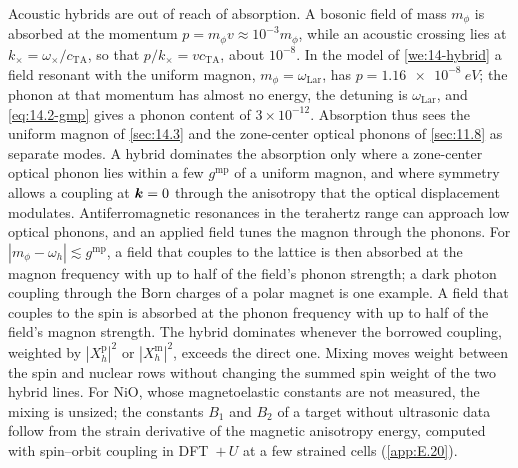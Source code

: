 Acoustic hybrids are out of reach of absorption. A bosonic field of mass $m_\phi$ is absorbed at the momentum $p = m_\phi v \approx 10^{-3}m_\phi$, while an acoustic crossing lies at $k_\times = \omega_\times/c_{\mathrm{TA}}$, so that $p/k_\times = vc_{\mathrm{TA}}$, about $10^{-8}$. In the model of \cref{we:14-hybrid} a field resonant with the uniform magnon, $m_\phi = \omega_{\mathrm{Lar}}$, has $p = \SI{1.16e-8}{eV}$; the phonon at that momentum has almost no energy, the detuning is $\omega_{\mathrm{Lar}}$, and \cref{eq:14.2-gmp} gives a phonon content of $3\times10^{-12}$. Absorption thus sees the uniform magnon of \cref{sec:14.3} and the zone-center optical phonons of \cref{sec:11.8} as separate modes. A hybrid dominates the absorption only where a zone-center optical phonon lies within a few $g^{\mathrm{mp}}$ of a uniform magnon, and where symmetry allows a coupling at $\bm{k} = 0$ through the anisotropy that the optical displacement modulates. Antiferromagnetic resonances in the terahertz range can approach low optical phonons, and an applied field tunes the magnon through the phonons. For $|m_\phi - \omega_h| \lesssim g^{\mathrm{mp}}$, a field that couples to the lattice is then absorbed at the magnon frequency with up to half of the field's phonon strength; a dark photon coupling through the Born charges of a polar magnet is one example. A field that couples to the spin is absorbed at the phonon frequency with up to half of the field's magnon strength. The hybrid dominates whenever the borrowed coupling, weighted by $|X^{\mathrm{p}}_h|^2$ or $|X^{\mathrm{m}}_h|^2$, exceeds the direct one. Mixing moves weight between the spin and nuclear rows without changing the summed spin weight of the two hybrid lines. For NiO, whose magnetoelastic constants are not measured, the mixing is unsized; the constants $B_1$ and $B_2$ of a target without ultrasonic data follow from the strain derivative of the magnetic anisotropy energy, computed with spin--orbit coupling in DFT~$+\,U$ at a few strained cells (\cref{app:E.20}).
